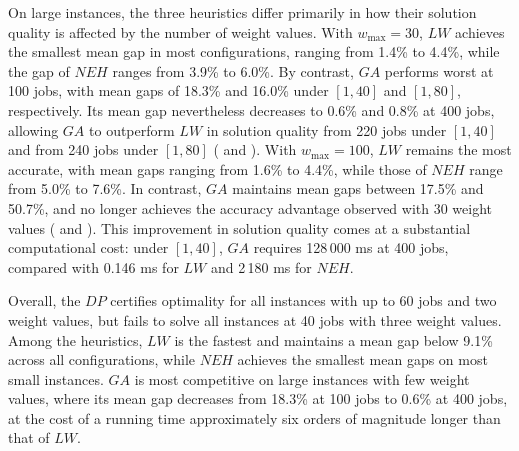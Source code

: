 \documentclass[12pt]{article} \textheight=24.5cm \textwidth=16.5cm \parskip = 0.165cm
\begin{document}
\begin{sloppypar}
        On large instances, the three heuristics differ primarily in how their solution quality is affected by the number of weight values.
        With $w_{\max}=30$, $LW$ achieves the smallest mean gap in most configurations, ranging from 1.4\% to 4.4\%, while the gap of $NEH$ ranges from 3.9\% to 6.0\%. 
        By contrast, $GA$ performs worst at 100 jobs, with mean gaps of 18.3\% and 16.0\% under $[1,40]$ and $[1,80]$, respectively.
        Its mean gap nevertheless decreases to 0.6\% and 0.8\% at 400 jobs, allowing $GA$ to outperform $LW$ in solution quality from 220 jobs under $[1,40]$ and from 240 jobs under $[1,80]$ ( and ).
        With $w_{\max}=100$, $LW$ remains the most accurate, with mean gaps ranging from 1.6\% to 4.4\%, while those of $NEH$ range from 5.0\% to 7.6\%. 
        In contrast, $GA$ maintains mean gaps between 17.5\% and 50.7\%, and no longer achieves the accuracy advantage observed with 30 weight values ( and ).
        This improvement in solution quality comes at a substantial computational cost: under $[1,40]$, $GA$ requires 128\,000 ms at 400 jobs, compared with 0.146 ms for $LW$ and 2\,180 ms for $NEH$.

        Overall, the $DP$ certifies optimality for all instances with up to 60 jobs and two weight values, but fails to solve all instances at 40 jobs with three weight values.
        Among the heuristics, $LW$ is the fastest and maintains a mean gap below 9.1\% across all configurations, while $NEH$ achieves the smallest mean gaps on most small instances.
        $GA$ is most competitive on large instances with few weight values, where its mean gap decreases from 18.3\% at 100 jobs to 0.6\% at 400 jobs, at the cost of a running time approximately six orders of magnitude longer than that of $LW$.



\end{sloppypar}
\end{document}
